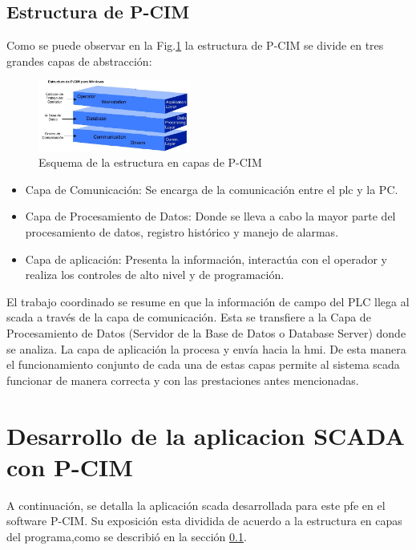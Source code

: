 \subsection{Estructura de P-CIM}
\label{sec:CapasPrograma}
Como se puede observar en la Fig.\ref{fig:estructuraSCADA} la estructura de P-CIM se divide en tres 
grandes capas de abstracción:
\begin{figure}[ht!]
	\centering
	\includegraphics[width=0.445\textwidth]
	{Cap5-SCADA/images/estructura.jpeg}
	\caption{Esquema de la estructura en capas de P-CIM}
	\label{fig:estructuraSCADA}
\end{figure}

\begin{itemize}
 \item Capa de Comunicación: Se encarga de la comunicación entre el \gls{plc} y la PC.
 \item Capa de Procesamiento de Datos: Donde se lleva a cabo la mayor parte del procesamiento 
 de datos, registro histórico y manejo de alarmas.
 \item Capa de aplicación: Presenta la información, interactúa con el operador y realiza 
 los controles de alto nivel y de programación.
\end{itemize}

El trabajo coordinado se resume en que la información de campo del PLC llega al \gls{scada} a 
través de la capa de comunicación. Esta se transfiere a la Capa de Procesamiento de Datos (Servidor 
de la Base de Datos o Database Server) donde se analiza. La capa de aplicación la procesa y envía 
hacia la \gls{hmi}. De esta manera el funcionamiento conjunto de cada una de estas capas permite 
al sistema \gls{scada} funcionar de manera correcta y con las prestaciones antes mencionadas.


\section{Desarrollo de la aplicacion SCADA con P-CIM}
A continuación, se detalla la aplicación \gls{scada} desarrollada para este \gls{pfe} en el 
software P-CIM. Su exposición esta dividida de acuerdo a la estructura en capas del programa,como 
se describió en la sección \ref{sec:CapasPrograma}.

